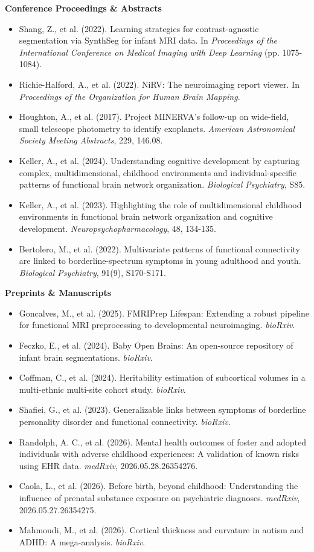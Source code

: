 \documentclass[a4paper,11pt]{article}
\newcommand{\resumePubItemListStart}{\begin{justify}\begin{itemize}[leftmargin=3ex, rightmargin=2ex, labelsep=1.2mm,itemsep=1.0mm]\small}
\newcommand{\resumePubHeading}[1]{\vspace{1mm}\item[] \textbf{#1}\vspace{-2.5mm}}
\newcommand{\resumePubItemListEnd}{\end{itemize}\end{justify}\vspace{-1mm}}
\begin{document}
\resumePubHeading{Conference Proceedings \& Abstracts}
\resumePubItemListStart
\item[] Shang, Z., et al. (2022). Learning strategies for contrast-agnostic segmentation via SynthSeg for infant MRI data. In \textit{Proceedings of the International Conference on Medical Imaging with Deep Learning} (pp. 1075-1084).
\item[] Richie-Halford, A., et al. (2022). NiRV: The neuroimaging report viewer. In \textit{Proceedings of the Organization for Human Brain Mapping}.
\item[] Houghton, A., et al. (2017). Project MINERVA's follow-up on wide-field, small telescope photometry to identify exoplanets. \textit{American Astronomical Society Meeting Abstracts}, 229, 146.08.
\item[] Keller, A., et al. (2024). Understanding cognitive development by capturing complex, multidimensional, childhood environments and individual-specific patterns of functional brain network organization. \textit{Biological Psychiatry}, S85.
\item[] Keller, A., et al. (2023). Highlighting the role of multidimensional childhood environments in functional brain network organization and cognitive development. \textit{Neuropsychopharmacology}, 48, 134-135.
\item[] Bertolero, M., et al. (2022). Multivariate patterns of functional connectivity are linked to borderline-spectrum symptoms in young adulthood and youth. \textit{Biological Psychiatry}, 91(9), S170-S171.
\resumePubItemListEnd

\resumePubHeading{Preprints \& Manuscripts}
\resumePubItemListStart
\item[] Goncalves, M., et al. (2025). FMRIPrep Lifespan: Extending a robust pipeline for functional MRI preprocessing to developmental neuroimaging. \textit{bioRxiv}.
\item[] Feczko, E., et al. (2024). Baby Open Brains: An open-source repository of infant brain segmentations. \textit{bioRxiv}.
\item[] Coffman, C., et al. (2024). Heritability estimation of subcortical volumes in a multi-ethnic multi-site cohort study. \textit{bioRxiv}.
\item[] Shafiei, G., et al. (2023). Generalizable links between symptoms of borderline personality disorder and functional connectivity. \textit{bioRxiv}.
\item[] Randolph, A. C., et al. (2026). Mental health outcomes of foster and adopted individuals with adverse childhood experiences: A validation of known risks using EHR data. \textit{medRxiv}, 2026.05.28.26354276.
\item[] Caola, L., et al. (2026). Before birth, beyond childhood: Understanding the influence of prenatal substance exposure on psychiatric diagnoses. \textit{medRxiv}, 2026.05.27.26354275.
\item[] Mahmoudi, M., et al. (2026). Cortical thickness and curvature in autism and ADHD: A mega-analysis. \textit{bioRxiv}.
\resumePubItemListEnd
\end{document}
